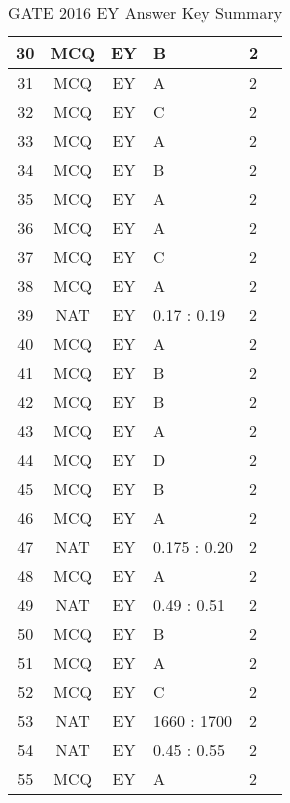 \begin{table}[h!]
\begin{tabular}{|c|c|c|p{1.8cm}|p{2.5cm}|c|}
\hline
30 & MCQ & EY & B         & 2 \\
\hline
31 & MCQ & EY & A         & 2 \\
\hline
32 & MCQ & EY & C         & 2 \\
\hline
33 & MCQ & EY & A         & 2 \\
\hline
34 & MCQ & EY & B         & 2 \\
\hline
35 & MCQ & EY & A         & 2 \\
\hline
36 & MCQ & EY & A         & 2 \\
\hline
37 & MCQ & EY & C         & 2 \\
\hline
38 & MCQ & EY & A         & 2 \\
\hline
39 & NAT & EY & 0.17 : 0.19 & 2 \\
\hline
40 & MCQ & EY & A         & 2 \\
\hline
41 & MCQ & EY & B         & 2 \\
\hline
42 & MCQ & EY & B         & 2 \\
\hline
43 & MCQ & EY & A         & 2 \\
\hline
44 & MCQ & EY & D         & 2 \\
\hline
45 & MCQ & EY & B         & 2 \\
\hline
46 & MCQ & EY & A         & 2 \\
\hline
47 & NAT & EY & 0.175 : 0.20 & 2 \\
\hline
48 & MCQ & EY & A         & 2 \\
\hline
49 & NAT & EY & 0.49 : 0.51  & 2 \\
\hline
50 & MCQ & EY & B         & 2 \\
\hline
51 & MCQ & EY & A         & 2 \\
\hline
52 & MCQ & EY & C         & 2 \\
\hline
53 & NAT & EY & 1660 : 1700 & 2 \\
\hline
54 & NAT & EY & 0.45 : 0.55 & 2 \\
\hline
55 & MCQ & EY & A         & 2 \\
\hline
\end{tabular}
\caption{GATE 2016 EY Answer Key Summary}
\end{table}
